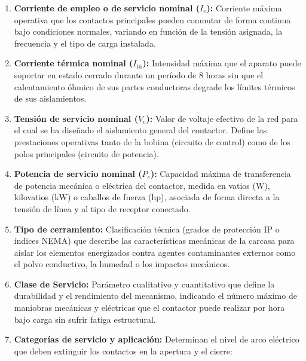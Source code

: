 \begin{enumerate}
    
    \item\textbf{Corriente de empleo o de servicio nominal ($I_e$):}
    Corriente máxima operativa que los contactos principales pueden conmutar de forma continua bajo condiciones normales, variando en función de la tensión asignada, la frecuencia y el tipo de carga instalada.
    
    \item\textbf{Corriente térmica nominal ($I_{th}$):}
    Intensidad máxima que el aparato puede soportar en estado cerrado durante un período de 8 horas sin que el calentamiento óhmico de sus partes conductoras degrade los límites térmicos de sus aislamientos.
    
    \item\textbf{Tensión de servicio nominal ($V_e$):}
    Valor de voltaje efectivo de la red para el cual se ha diseñado el aislamiento general del contactor. Define las prestaciones operativas tanto de la bobina (circuito de control) como de los polos principales (circuito de potencia).
    
    \item\textbf{Potencia de servicio nominal ($P_e$):}
    Capacidad máxima de transferencia de potencia mecánica o eléctrica del contactor, medida en vatios ($\text{W}$), kilovatios ($\text{kW}$) o caballos de fuerza ($\text{hp}$), asociada de forma directa a la tensión de línea y al tipo de receptor conectado.
    
    \item\textbf{Tipo de cerramiento:}
    Clasificación técnica (grados de protección IP o índices NEMA) que describe las características mecánicas de la carcasa para aislar los elementos energizados contra agentes contaminantes externos como el polvo conductivo, la humedad o los impactos mecánicos.
    
    \item\textbf{Clase de Servicio:} Parámetro cualitativo y cuantitativo que define la durabilidad y el rendimiento del mecanismo, indicando el número máximo de maniobras mecánicas y eléctricas que el contactor puede realizar por hora bajo carga sin sufrir fatiga estructural.

    \item\textbf{Categorías de servicio y aplicación:} Determinan el nivel de arco eléctrico que deben extinguir los contactos en la apertura y el cierre:
    \begin{enumerate}[label={\textbf{AC-\arabic*}:}, leftmargin=1.8cm, labelindent=0cm, itemsep=0.4cm, align=left]
    

\end{enumerate}
\end{enumerate}
